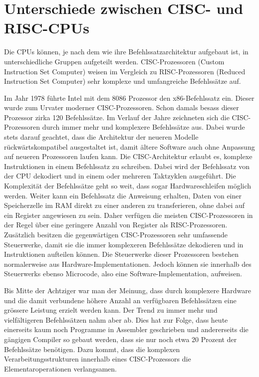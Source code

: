 \section{Unterschiede zwischen CISC- und RISC-CPUs\cite{Hoffmann2014_risc_cisc}}

Die CPUs können, je nach dem wie ihre Befehlssatzarchitektur aufgebaut ist, in unterschiedliche Gruppen aufgeteilt werden. CISC-Prozessoren (Custom Instruction Set Computer) weisen im Vergleich zu RISC-Prozessoren (Reduced Instruction Set Computer) sehr komplexe und umfangreiche Befehlssätze auf.
\par
Im Jahr 1978 führte Intel mit dem 8086 Prozessor den x86-Befehlssatz ein. Dieser wurde zum Urvater moderner CISC-Prozessoren. Schon damals besass dieser Prozessor zirka 120 Befehlssätze. Im Verlauf der Jahre zeichneten sich die CISC-Prozessoren durch immer mehr und komplexere Befehlssätze aus. Dabei wurde stets darauf geachtet, dass die Architektur der neueren Modelle rückwärtskompatibel ausgestaltet ist, damit ältere Software auch ohne Anpassung auf neueren Prozessoren laufen kann. Die CISC-Architektur erlaubt es, komplexe Instruktionen in einem Befehlssatz zu schreiben. Dabei wird der Befehlssatz von der CPU dekodiert und in einem oder mehreren Taktzyklen ausgeführt. Die Komplexität der Befehlssätze geht so weit, dass sogar Hardwareschleifen möglich werden. Weiter kann ein Befehlssatz die Anweisung erhalten, Daten von einer Speicherzelle im RAM direkt zu einer anderen zu transferieren, ohne dabei auf ein Register angewiesen zu sein. Daher verfügen die meisten CISC-Prozessoren in der Regel über eine geringere Anzahl von Register als RISC-Prozessoren. Zusätzlich besitzen die gegenwärtigen CISC-Prozessoren sehr umfassende Steuerwerke, damit sie die immer komplexeren Befehlssätze dekodieren und in Instruktionen aufteilen können. Die Steuerwerke dieser Prozessoren bestehen normalerweise aus Hardware-Implementationen. Jedoch können sie innerhalb des Steuerwerks ebenso Microcode, also eine Software-Implementation, aufweisen.
\par
Bis Mitte der Achtziger war man der Meinung, dass durch komplexere Hardware und die damit verbundene höhere Anzahl an verfügbaren Befehlssätzen eine grössere Leistung erzielt werden kann. Der Trend zu immer mehr und vielfältigeren Befehlssätzen nahm aber ab. Dies hat zur Folge, dass heute einerseits kaum noch Programme in Assembler geschrieben und andererseits die gängigen Compiler so gebaut werden, dass sie nur noch etwa 20 Prozent der Befehlssätze benötigen. Dazu kommt, dass die komplexen Verarbeitungsstrukturen innerhalb eines CISC-Prozessors die Elementaroperationen verlangsamen.

